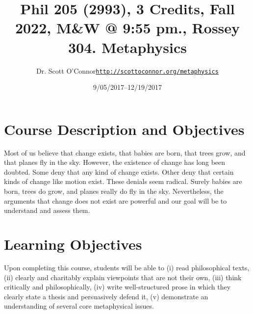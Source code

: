 \documentclass[article,oneside]{memoir}
\makeatletter
\def\myauthor{Author}
\def\mytitle{Title}
\def\mycopyright{\myauthor}
\def\myweb{\href{http://scottoconnor.org/metaphysics}{http://scottoconnor.org/metaphysics}}
\def\myauthor{Dr. Scott O'Connor}
\def\mytitle{{\normalsize Phil 205 (2993), 3 Credits, Fall 2022, M\&W @ 9:55 pm., Rossey 304. \newline} \HUGE Metaphysics}
\makeatother
\begin{document}
\setsansfont[Mapping=tex-text]{Georgia} 
\setmonofont[Mapping=tex-text,Scale=0.8]{Georgia} 

\def\ind{\hangindent=1 true cm\hangafter=1 \noindent}
\def\labelitemi{$\cdot$}

\pagestyle{kjh}

\title{\LARGE\mytitle}     
\author{\Large\myauthor \newline \footnotesize\texttt{\noindent\myweb}}
\date{9/05/2017--12/19/2017}

\published{\,}

\maketitle




%
%

\section{Course Description and Objectives}

Most of us believe that change exists, that babies are born, that trees grow, and that planes fly in the sky. However, the existence of change has long been doubted. Some deny that any kind of change exists. Other deny that certain kinds of change like motion exist. These denials seem radical. Surely babies are born, trees do grow, and planes really do fly in the sky. Nevertheless, the arguments that change does not exist are powerful and our goal will be to understand and assess them. 


\section{Learning Objectives}

Upon completing this course, students will be able to (i) read
philosophical texts, (ii) clearly and charitably explain viewpoints that
are not their own, (iii) think critically and philosophically, (iv)
write well-structured prose in which they clearly state a thesis and
persuasively defend it, (v) demonstrate an understanding of several core
metaphysical issues.
\end{document}
